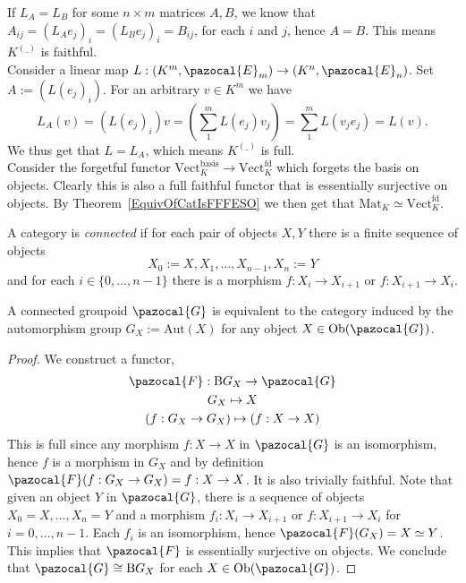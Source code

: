 \begin{example}
        If $L_A = L_B$ for some $n\times m$ matrices $A,B$, we know that $A_{ij}=(L_A e_j)_i = (L_B e_j)_i = B_{ij}$, for each $i$ and $j$, hence $A=B$. This means $K^{(\_)}$ is faithful.\\
        Consider a linear map $L : (K^m,\pazocal{E}_m)\rightarrow (K^n,\pazocal{E}_n)$. Set $A:= (L(e_j)_i)$. For an arbitrary $v\in K^m$ we have 
        $$
            L_A (v) = (L(e_j)_i) v = (\sum_1^m L(e_j) v_j)= \sum_1^m L(v_j e_j) = L(v). 
        $$
        We thus get that $L = L_A$, which means $K^{(\_)}$ is full.\\
        Consider the forgetful functor $\mathrm{Vect}_K^\mathrm{basis}\rightarrow \mathrm{Vect}_K^\mathrm{fd}$ which forgets the basis on objects. Clearly this is also a full faithful functor that is essentially surjective on objects. By Theorem~\ref{EquivOfCatIsFFFESO} we then get that $\mathrm{Mat}_K\simeq \mathrm{Vect}_K^\mathrm{fd}$.
    \end{example}
    \begin{definition}
        A category is \emph{connected} if for each pair of objects $X,Y$ there is a finite sequence of objects
        $$
            X_0:= X, X_1,\dots,X_{n-1},X_n := Y
        $$
        and for each $i\in \{0,\dots,n-1\}$ there is a morphism $f : X_i\rightarrow X_{i+1}$ or $f: X_{i+1}\rightarrow X_i$.
    \end{definition}
    \begin{proposition}\label{AConnectedGroupoidIsEquivalentToAllItsAutomorphismGroups}
        A connected groupoid $\pazocal{G}$ is equivalent to the category induced by the automorphism group $G_X:= \mathrm{Aut}(X)$ for any object $X\in \Ob(\pazocal{G})$.
    \end{proposition}
    \begin{proof}
        We construct a functor, 
        \begin{gather*}
           \pazocal{F}:\mathrm{B}G_X \rightarrow \pazocal{G}\\
           G_X \mapsto X\\ 
           (f : G_X\rightarrow G_X) \mapsto (f: X \rightarrow X) 
        \end{gather*}
        This is full since any morphism $f:X\rightarrow X$ in $\pazocal{G}$ is an isomorphism, hence $f$ is a morphism in $G_X$ and by definition $\pazocal{F}(f: G_X\rightarrow G_X)= f:X\rightarrow X$. It is also trivially faithful. Note that given an object $Y$ in $\pazocal{G}$, there is a sequence of objects $X_0 = X,\dots,X_n = Y$ and a morphism $f_i : X_i\rightarrow X_{i+1}$ or $f: X_{i+1}\rightarrow X_i$ for $i=0,\dots,n-1$. Each $f_i$ is an isomorphism, hence $\pazocal{F}(G_X)=X\simeq Y$. This implies that $\pazocal{F}$ is essentially surjective on objects. We conclude that $\pazocal{G} \cong \mathrm{B}G_X$ for each $X\in \Ob(\pazocal{G})$.
    \end{proof}
